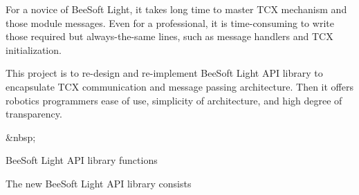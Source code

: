 \par For a novice of BeeSoft Light, it takes long time to master TCX
mechanism and those module messages. Even for a professional, it is
time-consuming to write those required but always-the-same lines, such
as message handlers and TCX initialization. \par \par This project is
to re-design and re-implement BeeSoft Light API library to encapsulate
TCX communication and message passing architecture. Then it offers
robotics programmers ease of use, simplicity of architecture, and high
degree of transparency. \par \par \&nbsp;\par \par BeeSoft Light API
library functions\par \par The new BeeSoft Light API library consists
